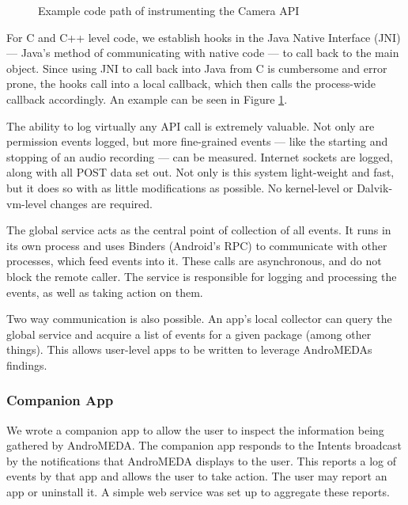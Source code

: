 \documentclass{acm_proc_article-sp}
\begin{document}
\begin{figure}[t]
\begin{center}
\caption{Example code path of instrumenting the Camera API}
\label{fig:camera-example}
\end{center}
\end{figure}

For C and C++ level code, we establish hooks in the Java Native Interface (JNI) --- Java's method of communicating with native code --- to call back to the main object. Since using JNI to call back into Java from C is cumbersome and error prone, the hooks call into a local callback, which then calls the process-wide callback accordingly. An example can be seen in Figure \ref{fig:camera-example}.

The ability to log virtually any API call is extremely valuable. Not only are permission events logged, but more fine-grained events --- like the starting and stopping of an audio recording --- can be measured. Internet sockets are logged, along with all POST data set out. Not only is this system light-weight and fast, but it does so with as little modifications as possible. No kernel-level or Dalvik-vm-level changes are required.

The global service acts as the central point of collection of all events. It runs in its own process and uses Binders (Android's RPC) to communicate with other processes, which feed events into it. These calls are asynchronous, and do not block the remote caller. The service is responsible for logging and processing the events, as well as taking action on them.

Two way communication is also possible. An app's local collector can query the global service and acquire a list of events for a given package (among other things). This allows user-level apps to be written to leverage AndroMEDAs findings.

\subsubsection{Companion App}
We wrote a companion app to allow the user to inspect the information being gathered by AndroMEDA. The companion app responds to the Intents broadcast by the notifications that AndroMEDA displays to the user. This reports a log of events by that app and allows the user to take action. The user may report an app or uninstall it. A simple web service was set up to aggregate these reports.
\end{document}
